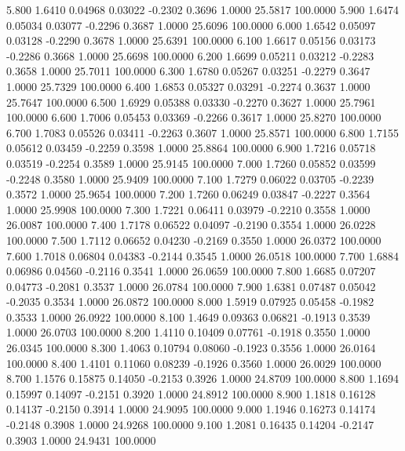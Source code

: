    5.800   1.6410   0.04968   0.03022  -0.2302   0.3696   1.0000  25.5817 100.0000
   5.900   1.6474   0.05034   0.03077  -0.2296   0.3687   1.0000  25.6096 100.0000
   6.000   1.6542   0.05097   0.03128  -0.2290   0.3678   1.0000  25.6391 100.0000
   6.100   1.6617   0.05156   0.03173  -0.2286   0.3668   1.0000  25.6698 100.0000
   6.200   1.6699   0.05211   0.03212  -0.2283   0.3658   1.0000  25.7011 100.0000
   6.300   1.6780   0.05267   0.03251  -0.2279   0.3647   1.0000  25.7329 100.0000
   6.400   1.6853   0.05327   0.03291  -0.2274   0.3637   1.0000  25.7647 100.0000
   6.500   1.6929   0.05388   0.03330  -0.2270   0.3627   1.0000  25.7961 100.0000
   6.600   1.7006   0.05453   0.03369  -0.2266   0.3617   1.0000  25.8270 100.0000
   6.700   1.7083   0.05526   0.03411  -0.2263   0.3607   1.0000  25.8571 100.0000
   6.800   1.7155   0.05612   0.03459  -0.2259   0.3598   1.0000  25.8864 100.0000
   6.900   1.7216   0.05718   0.03519  -0.2254   0.3589   1.0000  25.9145 100.0000
   7.000   1.7260   0.05852   0.03599  -0.2248   0.3580   1.0000  25.9409 100.0000
   7.100   1.7279   0.06022   0.03705  -0.2239   0.3572   1.0000  25.9654 100.0000
   7.200   1.7260   0.06249   0.03847  -0.2227   0.3564   1.0000  25.9908 100.0000
   7.300   1.7221   0.06411   0.03979  -0.2210   0.3558   1.0000  26.0087 100.0000
   7.400   1.7178   0.06522   0.04097  -0.2190   0.3554   1.0000  26.0228 100.0000
   7.500   1.7112   0.06652   0.04230  -0.2169   0.3550   1.0000  26.0372 100.0000
   7.600   1.7018   0.06804   0.04383  -0.2144   0.3545   1.0000  26.0518 100.0000
   7.700   1.6884   0.06986   0.04560  -0.2116   0.3541   1.0000  26.0659 100.0000
   7.800   1.6685   0.07207   0.04773  -0.2081   0.3537   1.0000  26.0784 100.0000
   7.900   1.6381   0.07487   0.05042  -0.2035   0.3534   1.0000  26.0872 100.0000
   8.000   1.5919   0.07925   0.05458  -0.1982   0.3533   1.0000  26.0922 100.0000
   8.100   1.4649   0.09363   0.06821  -0.1913   0.3539   1.0000  26.0703 100.0000
   8.200   1.4110   0.10409   0.07761  -0.1918   0.3550   1.0000  26.0345 100.0000
   8.300   1.4063   0.10794   0.08060  -0.1923   0.3556   1.0000  26.0164 100.0000
   8.400   1.4101   0.11060   0.08239  -0.1926   0.3560   1.0000  26.0029 100.0000
   8.700   1.1576   0.15875   0.14050  -0.2153   0.3926   1.0000  24.8709 100.0000
   8.800   1.1694   0.15997   0.14097  -0.2151   0.3920   1.0000  24.8912 100.0000
   8.900   1.1818   0.16128   0.14137  -0.2150   0.3914   1.0000  24.9095 100.0000
   9.000   1.1946   0.16273   0.14174  -0.2148   0.3908   1.0000  24.9268 100.0000
   9.100   1.2081   0.16435   0.14204  -0.2147   0.3903   1.0000  24.9431 100.0000
